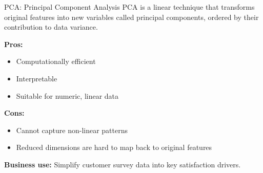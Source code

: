 \documentclass[aspectratio=169, table]{beamer}
\begin{document}
\begin{frame}{PCA: Principal Component Analysis}
	PCA is a linear technique that transforms original features into new variables called principal components, ordered by their contribution to data variance.
	
	\textbf{Pros:}
	\begin{itemize}
		\item Computationally efficient
		\item Interpretable
		\item Suitable for numeric, linear data
	\end{itemize}
	
	\textbf{Cons:}
	\begin{itemize}
		\item Cannot capture non-linear patterns
		\item Reduced dimensions are hard to map back to original features
	\end{itemize}
	
	\textbf{Business use:} Simplify customer survey data into key satisfaction drivers.
\end{frame}

%	
%	
%	
%
%	
%	
\end{document}
